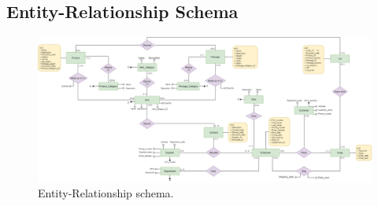 \subsection{Entity-Relationship Schema}
	\begin{figure}[!h]
		\centering
		\includegraphics[width=1.3\linewidth,angle=270,origin=c]{ER-Schema.png}
		\caption{Entity-Relationship schema.}
		\label{fig:er-schema}
	\end{figure}

